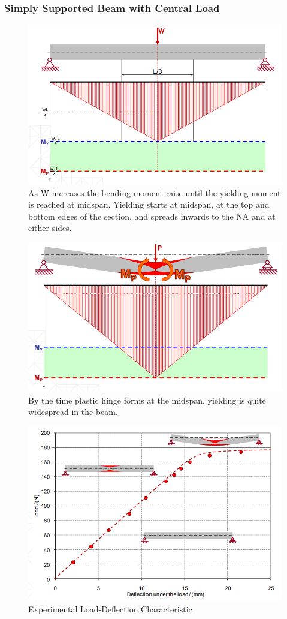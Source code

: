 \documentclass[class=report, crop=false, 12pt,a4paper]{standalone}
\begin{document}
\subsubsection{\large Simply Supported Beam with Central Load}
\begin{figure}[H]
  \centering
  \includegraphics[width = 0.9 \textwidth]{../img/beam22.PNG}
  \caption{As W increases the bending moment raise until the yielding moment is reached at midspan. Yielding starts at midspan, at the top and bottom edges of the section, and spreads inwards to the NA and at either sides.}
\end{figure}
\begin{figure}[H]
  \centering
  \includegraphics[width = 0.9 \textwidth]{../img/beam23.PNG}
  \caption{By the time plastic hinge forms at the midspan, yielding is quite widespread in the beam.}
\end{figure}
\begin{figure}[H]
  \centering
  \includegraphics[width = 0.9 \textwidth]{../img/graph7.PNG}
  \caption{Experimental Load-Deflection Characteristic}
\end{figure}
\end{document}
